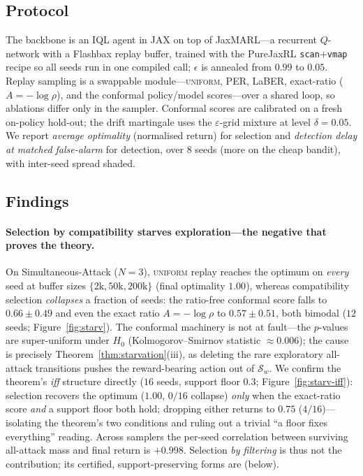 \documentclass[sigconf]{aamas}
\begin{document}
\subsection{Protocol}
\label{sec:protocol}
The backbone is an IQL agent in JAX on top of JaxMARL---a recurrent $Q$-network
with a Flashbax replay buffer, trained with the PureJaxRL
\texttt{scan}+\texttt{vmap} recipe so all seeds run in one compiled call;
$\epsilon$ is annealed from $0.99$ to $0.05$. Replay sampling is a swappable
module---\textsc{uniform}, PER, LaBER, exact-ratio ($A=-\log\rho$), and the
conformal policy/model scores---over a shared loop, so ablations differ only in the
sampler. Conformal scores are calibrated on a fresh on-policy hold-out; the drift
martingale uses the $\varepsilon$-grid mixture at level $\delta=0.05$. We report
\emph{average optimality} (normalised return) for selection and \emph{detection
delay at matched false-alarm} for detection, over $8$ seeds (more on the cheap
bandit), with inter-seed spread shaded.

\subsection{Findings}
\paragraph{Selection by compatibility starves exploration---the negative that
proves the theory.} On Simultaneous-Attack ($N=3$), \textsc{uniform} replay reaches
the optimum on \emph{every} seed at buffer sizes $\{2\mathrm{k},50\mathrm{k},
200\mathrm{k}\}$ (final optimality $1.00$), whereas compatibility selection
\emph{collapses} a fraction of seeds: the ratio-free conformal score falls to
$0.66\pm0.49$ and even the exact ratio $A=-\log\rho$ to $0.57\pm0.51$, both bimodal
($12$ seeds; Figure~\ref{fig:starv}). The conformal machinery is not at fault---the
$p$-values are super-uniform under $H_0$ (Kolmogorov--Smirnov statistic
$\approx0.006$); the cause is precisely Theorem~\ref{thm:starvation}(iii), as
deleting the rare exploratory all-attack transitions pushes the reward-bearing
action out of $\mathcal{S}_w$. We confirm the theorem's \emph{iff} structure
directly ($16$ seeds, support floor $0.3$; Figure~\ref{fig:starv-iff}): selection
recovers the optimum ($1.00$, $0/16$ collapse) \emph{only} when the exact-ratio
score \emph{and} a support floor both hold; dropping either returns to $0.75$
($4/16$)---isolating the theorem's two conditions and ruling out a trivial
``a floor fixes everything'' reading. Across samplers the per-seed correlation
between surviving all-attack mass and final return is $+0.998$. Selection
\emph{by filtering} is thus not the contribution; its certified, support-preserving
forms are (below).
\end{document}
